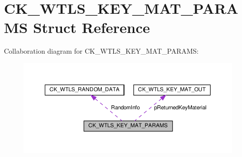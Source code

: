 \hypertarget{struct_c_k___w_t_l_s___k_e_y___m_a_t___p_a_r_a_m_s}{}\section{C\+K\+\_\+\+W\+T\+L\+S\+\_\+\+K\+E\+Y\+\_\+\+M\+A\+T\+\_\+\+P\+A\+R\+A\+MS Struct Reference}
\label{struct_c_k___w_t_l_s___k_e_y___m_a_t___p_a_r_a_m_s}


Collaboration diagram for C\+K\+\_\+\+W\+T\+L\+S\+\_\+\+K\+E\+Y\+\_\+\+M\+A\+T\+\_\+\+P\+A\+R\+A\+MS\+:
\nopagebreak
\begin{figure}[H]
\begin{center}
\leavevmode
\includegraphics[width=350pt]{struct_c_k___w_t_l_s___k_e_y___m_a_t___p_a_r_a_m_s__coll__graph}
\end{center}
\end{figure}
